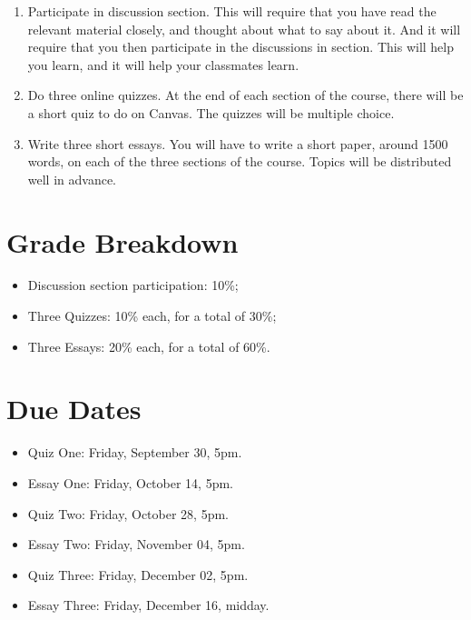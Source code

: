 \documentclass[
]{article}
\providecommand{\tightlist}{%
  \setlength{\itemsep}{0pt}\setlength{\parskip}{0pt}}\usepackage{longtable,booktabs,array}
\begin{document}
\begin{enumerate}
\def\labelenumi{\arabic{enumi}.}
\item
  Participate in discussion section. This will require that you have
  read the relevant material closely, and thought about what to say
  about it. And it will require that you then participate in the
  discussions in section. This will help you learn, and it will help
  your classmates learn.
\item
  Do three online quizzes. At the end of each section of the course,
  there will be a short quiz to do on Canvas. The quizzes will be
  multiple choice.
\item
  Write three short essays. You will have to write a short paper, around
  1500 words, on each of the three sections of the course. Topics will
  be distributed well in advance.
\end{enumerate}

\hypertarget{grade-breakdown}{%
\section{Grade Breakdown}\label{grade-breakdown}}

\begin{itemize}
\tightlist
\item
  Discussion section participation: 10\%;
\item
  Three Quizzes: 10\% each, for a total of 30\%;
\item
  Three Essays: 20\% each, for a total of 60\%.
\end{itemize}

\hypertarget{due-dates}{%
\section{Due Dates}\label{due-dates}}

\begin{itemize}
\tightlist
\item
  Quiz One: Friday, September 30, 5pm.
\item
  Essay One: Friday, October 14, 5pm.
\item
  Quiz Two: Friday, October 28, 5pm.
\item
  Essay Two: Friday, November 04, 5pm.
\item
  Quiz Three: Friday, December 02, 5pm.
\item
  Essay Three: Friday, December 16, midday.
\end{itemize}
\end{document}

